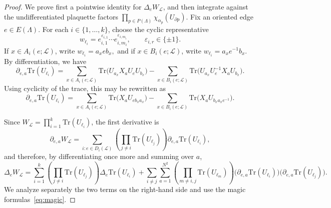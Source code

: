 \documentclass[11pt,a4paper,reqno]{article}
\theoremstyle{definition}
\theoremstyle{remark}
\newcommand\Tr{\mathrm{Tr}}
\newcommand\Lc{{\mathcal{L}}}
\begin{document}
\begin{proof}
We prove first a pointwise identity for $\Delta_eW_{\Lc}$, and then integrate against the undifferentiated plaquette factors $\prod_{p\in P(\Lambda)}\chi_{\alpha_p}(U_{\partial p})$. Fix an oriented edge $e\in E(\Lambda)$. For each $i\in\{1,\dots,k\}$, choose the cyclic representative
\[
w_{\ell_i}=e_{i,1}^{\varepsilon_{i,1}}\cdots e_{i,m_i}^{\varepsilon_{i,m_i}},\qquad \varepsilon_{i,r}\in\{\pm1\}.
\]
If $x\in A_i(e;\Lc)$, write $w_{\ell_i}=a_xeb_x,$ and if $x\in B_i(e;\Lc)$, write $w_{\ell_i}=a_xe^{-1}b_x.$ By differentiation, we have
\[
\partial_{e,a}\Tr(U_{\ell_i})=\sum_{x\in A_i(e;\Lc)}\Tr\bigl(U_{a_x}X_aU_eU_{b_x}\bigr)-\sum_{x\in B_i(e;\Lc)}\Tr\bigl(U_{a_x}U_e^{-1}X_aU_{b_x}\bigr).
\]
Using cyclicity of the trace, this may be rewritten as
\begin{equation}\label{eq:local-first-derivative-loop}
\partial_{e,a}\Tr(U_{\ell_i})=\sum_{x\in A_i(e;\Lc)} \Tr\bigl(X_aU_{e b_x a_x}\bigr)-\sum_{x\in B_i(e;\Lc)} \Tr\bigl(X_aU_{b_x a_x e^{-1}}\bigr).
\end{equation}

Since $W_{\Lc}=\prod_{i=1}^k \Tr(U_{\ell_i})$, the first derivative is
\[
\partial_{e,a}W_{\Lc}=\sum_{i:e\in D_i(\Lc)}\left(\prod_{j\neq i}\Tr(U_{\ell_j})\right)\partial_{e,a}\Tr(U_{\ell_i}),
\]
and therefore, by differentiating once more and summing over $a$,
\[
\Delta_eW_{\Lc}=\sum_{i=1}^k\left(\prod_{j\neq i}\Tr(U_{\ell_j})\right)\Delta_e\Tr(U_{\ell_i})+\sum_{i\neq j}\sum_{a=1}^{N^2}\left(\prod_{m\neq i,j}\Tr(U_{\ell_m})\right)\bigl(\partial_{e,a}\Tr(U_{\ell_i})\bigr)\bigl(\partial_{e,a}\Tr(U_{\ell_j})\bigr).
\]
We analyze separately the two terms on the right-hand side and use the magic formulas~\eqref{eq:magic}.

\smallskip


\end{proof}
\end{document}

